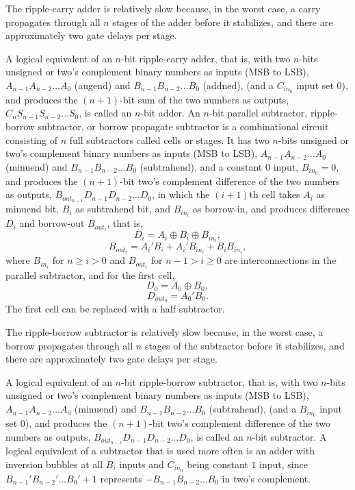\documentclass[a4paper,12pt]{report}
\begin{document}
The ripple-carry adder is relatively slow because, in the worst case, a carry propagates through all $n$ stages of the adder before it stabilizes, and there are approximately two gate delays per stage.

A logical equivalent of an $n$-bit ripple-carry adder, that is, with two $n$-bits unsigned or two's complement binary numbers as inputs (MSB to LSB), $A_{n-1}A_{n-2}\ldots A_0$ (augend) and $B_{n-1}B_{n-2}\ldots B_0$ (addned), (and a $C_{in_0}$ input set 0), and produces the $(n+1)$-bit sum of the two numbers as outputs, $C_nS_{n-1}S_{n-2}\ldots S_0$, is called an $n$-bit adder.
An $n$-bit parallel subtractor, ripple-borrow subtractor, or borrow propagate subtractor is a combinational circuit consisting of $n$ full subtractors called cells or stages. It has two $n$-bits unsigned or two's complement binary numbers as inputs (MSB to LSB), $A_{n-1}A_{n-2}\ldots A_0$ (minuend) and $B_{n-1}B_{n-2}\ldots B_0$ (subtrahend), and a constant $0$ input, $B_{in_0}=0$, and produces the $(n+1)$-bit two's complement difference of the two numbers as outputs, $B_{out_{n-1}}D_{n-1}D_{n-2}\ldots D_0$, in which the $(i+1)$th cell takes $A_i$ as minuend bit, $B_i$ as subtrahend bit, and $B_{in_i}$ as borrow-in, and produces difference $D_i$ and borrow-out $B_{out_i}$, that is,
\[D_i=A_i\oplus B_i\oplus B_{in_i},\]
\[B_{out_i}=A_i'B_i+A_i'B_{in_i}+B_iB_{in_i},\]
where $B_{in_i}$ for $n\geq i>0$ and $B_{out_i}$ for $n-1>i\geq 0$ are interconnections in the parallel subtractor, and for the first cell,
\[D_0=A_0\oplus B_0,\]
\[D_{out_0}=A_0'B_0.\]
The first cell can be replaced with a half subtractor.

The ripple-borrow subtractor is relatively slow because, in the worst case, a borrow propagates through all $n$ stages of the subtractor before it stabilizes, and there are approximately two gate delays per stage.

A logical equivalent of an $n$-bit ripple-borrow subtractor, that is, with two $n$-bits unsigned or two's complement binary numbers as inputs (MSB to LSB), $A_{n-1}A_{n-2}\ldots A_0$ (minuend) and $B_{n-1}B_{n-2}\ldots B_0$ (subtrahend), (and a $B_{in_0}$ input set 0), and produces the $(n+1)$-bit two's complement difference of the two numbers as outputs, $B_{out_{n-1}}D_{n-1}D_{n-2}\ldots D_0$, is called an $n$-bit subtractor.
A logical equivalent of a subtractor that is used more often is an adder with inversion bubbles at all $B_i$ inputs and $C_{in_0}$ being constant $1$ input, since $B_{n-1}'B_{n-2}'\ldots B_0'+1$ represents $-B_{n-1}B_{n-2}\ldots B_0$ in two's complement.
\end{document}
